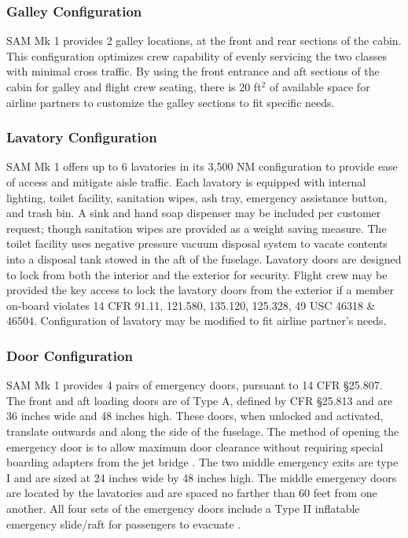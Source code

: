 \subsubsection{Galley Configuration}
SAM Mk 1 provides 2 galley locations, at the front and rear sections of the cabin.  This configuration optimizes crew capability of evenly servicing the two classes with minimal cross traffic.  By using the front entrance and aft sections of the cabin for galley and flight crew seating, there is 20 ft$^2$ of available space for airline partners to customize the galley sections to fit specific needs.

\subsubsection{Lavatory Configuration}
SAM Mk 1 offers up to 6 lavatories in its 3,500 NM configuration to provide ease of access and mitigate aisle traffic.  Each lavatory is equipped with internal lighting, toilet facility, sanitation wipes, ash tray, emergency assistance button, and trash bin.  A sink and hand soap dispenser may be included per customer request; though sanitation wipes are provided as a weight saving measure.  The toilet facility uses negative pressure vacuum disposal system to vacate contents into a disposal tank stowed in the aft of the fuselage.\cite{toilet}  Lavatory doors are designed to lock from both the interior and the exterior for security.  Flight crew may be provided the key access to lock the lavatory doors from the exterior if a member on-board violates 14 CFR 91.11, 121.580, 135.120, 125.328, 49 USC 46318 \& 46504.  Configuration of lavatory may be modified to fit airline partner's needs.

\subsubsection{Door Configuration}
SAM Mk 1 provides 4 pairs of emergency doors, pursuant to 14 CFR \S25.807.  The front and aft loading doors are of Type A, defined by CFR \S25.813 and are 36 inches wide and 48 inches high.  These doors, when unlocked and activated, translate outwards and along the side of the fuselage.  The method of opening the emergency door is to allow maximum door clearance without requiring special boarding adapters from the jet bridge \cite{cfr}.  The two middle emergency exits are type I and are sized at 24 inches wide by 48 inches high.  The middle emergency doors are located by the lavatories and are spaced no farther than 60 feet from one another.  All four sets of the emergency doors include a Type II inflatable emergency slide/raft for passengers to evacuate \cite{slides}.

